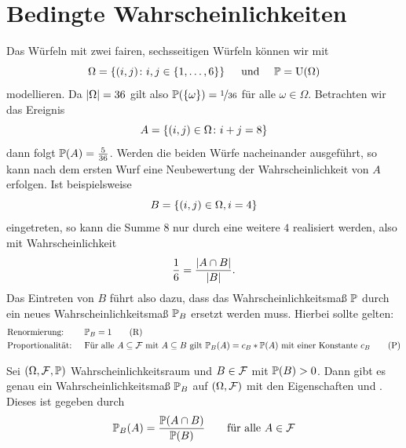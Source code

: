 \section{Bedingte Wahrscheinlichkeiten}
\begin{beispiel}\label{beispiel: 3_1_1_wuerfel}
	Das Würfeln mit zwei fairen, sechsseitigen Würfeln können wir mit 
	\begin{equation*}
		\Omega = \menge{(i,j) \colon i,j \in \menge{1,\dots,6}} \quad \und \quad \P = \Uni(\Omega)
	\end{equation*}
	modellieren. Da $\abs{\Omega} = 36$ gilt also $\P(\menge{\omega}) = \lfrac{1}{36}$ für alle $\omega \in \Omega$. Betrachten wir das Ereignis
	\begin{equation*}
		A = \menge{(i,j) \in \Omega \colon i + j = 8}
	\end{equation*}
	dann folgt $\P(A) = \frac{5}{36}$.	Werden die beiden Würfe nacheinander ausgeführt, so kann nach dem ersten Wurf eine Neubewertung der Wahrscheinlichkeit von $A$ erfolgen. Ist beispielsweise
	\begin{equation*}
		B = \menge{(i,j) \in \Omega, i = 4}
	\end{equation*} 
	eingetreten, so kann die Summe $8$ nur durch eine weitere $4$ realisiert werden, also mit Wahrscheinlichkeit
	\begin{equation*}
		\frac{1}{6} = \frac{\abs{A \cap B}}{\abs{B}}. 
	\end{equation*}
	Das Eintreten von $B$ führt also dazu, dass das Wahrscheinlichkeitsmaß $\P$ durch ein neues Wahrscheinlichkeitsmaß $\P_{B}$ ersetzt werden muss. Hierbei sollte gelten:
	\begin{align}
		&\text{Renormierung: } &&\P_{B} = 1 \label{eq: Renormierung} \tag{R}\\
		&\text{Proportionalität: } &&\text{Für alle } A \subseteq \F \mit A \subseteq B \text{ gilt } \P_{B}(A) = c_B * \P(A) 
		\text{ mit einer Konstante } c_B \label{eq: Proportionalitaet} \tag{P}
	\end{align}
\end{beispiel}

\begin{lemma}
	Sei $(\Omega, \F, \P)$ Wahrscheinlichkeitsraum und $B \in \F$ mit $\P(B) > 0$. Dann gibt es genau ein Wahrscheinlichkeitsmaß $\P_B$ auf $(\Omega, \F)$ mit den Eigenschaften  und . Dieses ist gegeben durch
	\begin{equation*}
		\P_B(A) = \frac{\P(A \cap B)}{\P(B)} \qquad \text{für alle } A \in \F
	\end{equation*}
\end{lemma}

